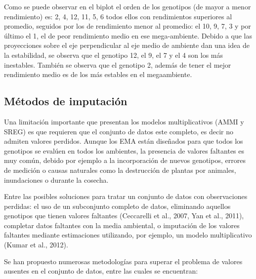 Como se puede observar en el biplot el orden de los genotipos (de mayor a menor rendimiento) es: 2, 4, 12, 11, 5, 6 todos ellos con rendimientos superiores al promedio, seguidos por los de rendimiento menor al promedio: el 10, 9, 7, 3 y por último el 1, el de peor rendimiento medio en ese mega-ambiente.
Debido a que las proyecciones sobre el eje perpendicular al eje medio de ambiente dan una idea de la estabilidad, se observa que el genotipo 12, el 9, el 7 y el 4 son los más inestables. También se observa que el genotipo 2, además de tener el mejor rendimiento medio es de los más estables en el megaambiente.


\subsection{Métodos de imputación}


Una limitación importante que presentan los modelos multiplicativos (AMMI y SREG) es que requieren que el conjunto de datos este completo, es decir no admiten valores perdidos. Aunque los EMA están diseñados para que todos los genotipos se evalúen en todos los ambientes, la presencia de valores faltantes es muy común, debido por ejemplo a la incorporación de nuevos genotipos, errores de medición o causas naturales como la destrucción de plantas por animales, inundaciones o durante la cosecha.

Entre las posibles soluciones para tratar un conjunto de datos con observaciones perdidas: el uso de un subconjunto completo de datos, eliminando aquellos genotipos que tienen valores faltantes (Ceccarelli et al., 2007, Yan et al., 2011), completar datos faltantes con la media ambiental, o imputación de los valores faltantes mediante estimaciones utilizando, por ejemplo, un modelo multiplicativo (Kumar et al., 2012).

Se han propuesto numerosas metodologías para superar el problema de valores ausentes en el conjunto de datos, entre las cuales se encuentran:

